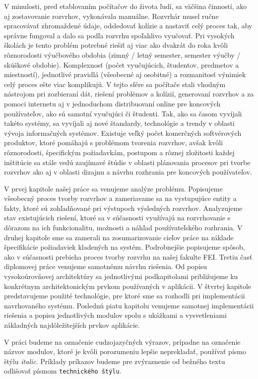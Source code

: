 \enlargethispage{1cm}
V minulosti, pred etablovaním počítačov do života ľudí, sa väčšina činností,
ako aj zostavovanie rozvrhov, vykonávala manuálne. Rozvrhár musel ručne
spracovávať zhromaždené údaje, odsledovať kolízie a nastaviť celý proces tak,
aby správne fungoval a dalo sa podľa rozvrhu spoľahlivo vyučovať. Pri vysokých
školách je tento problém potrebné riešiť aj viac ako dvakrát do roka kvôli rôznorodosti
výučbového obdobia (zimný / letný semester, semester výučby / skúškové obdobie).
Komplexnosť (počet vyučujúcich, študentov, predmetov a miestností), jednotlivé
pravidlá (všeobecné aj osobitné) a rozmanitosť výnimiek celý proces ešte viac komplikujú.
V tejto sfére sa počítače stali vhodným nástrojom pri zozbieraní dát, riešení problémov a
kolízií, generovaní rozvrhov a za pomoci internetu aj v jednoduchom distribuovaní online
pre koncových používateľov, ako sú samotní vyučujúci či študenti. Tak, ako sa časom
vyvíjali takéto systémy, sa vyvíjali aj nové štandardy, technológie a trendy v oblasti
vývoja informačných systémov.
Existuje veľký počet komerčných softvérových produktov, ktoré pomáhajú
s problémom tvorenia rozvrhov, avšak kvôli rôznorodosti, špecifickým požiadavkám,
postupom a rôznej zložitosti každej inštitúcie sa stále vedú zaujímavé štúdie v oblasti
plánovania procesov pri tvorbe rozvrhov ako aj v oblasti dizajnu a návrhu rozhrania
pre koncových používateľov.

\vskip 0.5cm
V prvej kapitole našej práce sa venujeme analýze problému. Popisujeme všeobecný proces
tvorby rozvrhov a zameriavame sa na vystupujúce entity a fakty, ktoré sú zohľadňované
pri výstupoch výsledných rozvrhov. Analyzujeme stav existujúcich riešení, ktoré sa 
v súčasnosti využívajú na rozvrhovanie s dôrazom na ich funkcionalitu, možnosti a náhľad
používateľského rozhrania.
V druhej kapitole sme sa zamerali na zosumarizovanie cieľov práce na základe špecifikácie
požiadaviek kladených na systém. Podrobnejšie popisujeme spôsob, ako v súčasnosti
prebieha proces tvorby rozvrhu na našej fakulte FEI.
Tretiu časť diplomovej práce venujeme samotnému návrhu riešenia. Od popisu vysokoúrovňovej
architektúry sa jednotlivými podkapitolami približujeme ku konkrétnym architektonickým prvkom
používaných v aplikácii.
V štvrtej kapitole predstavujeme použité technológie, pre ktoré sme sa rozhodli pri implementácii
navrhovaného systému.
Poslednú piatu kapitolu venujeme samotnej implementácii riešenia a popisu jednotlivých modulov
spolu s ukážkami a vysvetleniami základných najdôležitejších prvkov aplikácie.

\vskip 0.5cm
V práci budeme na označenie cudzojazyčných výrazov, prípadne na označenie názvov modulov,
ktoré je kvôli porozumeniu lepšie neprekladať, používať písmo štýlu \textit{italic}. Príklady príkazov
budeme pre zvýraznenie od bežného textu odlišovať písmom \texttt{technického štýlu}.



